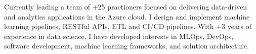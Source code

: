 

\begin{cvparagraph}

Currently leading a team of +25 practioners focused on delivering data-driven and analytics applications in the Azure cloud. I design and implement machine learning pipelines, RESTful APIs, ETL and CI/CD pipelines. With +3 years of experience in data science, I have developed interests in MLOps, DevOps, software development, machine learning frameworks, and solution architecture.
\end{cvparagraph}
